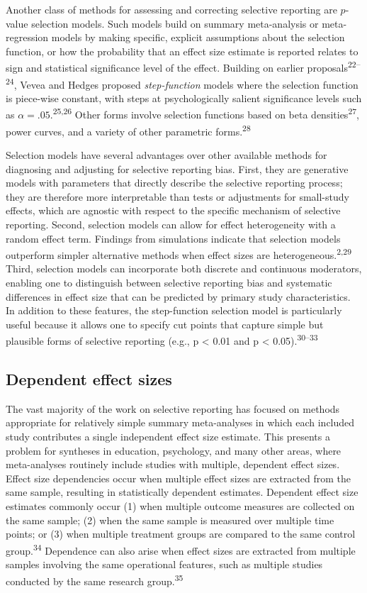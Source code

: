 \documentclass[
  american,
  man, donotrepeattitle,floatsintext]{apa7}
\begin{document}
Another class of methods for assessing and correcting selective reporting are \(p\)-value selection models.
Such models build on summary meta-analysis or meta-regression models by making specific, explicit assumptions about the selection function, or how the probability that an effect size estimate is reported relates to sign and statistical significance level of the effect. Building on earlier proposals\textsuperscript{22--24}, Vevea and Hedges proposed \emph{step-function} models where the selection function is piece-wise constant, with steps at psychologically salient significance levels such as \(\alpha = .05\).\textsuperscript{25,26}
Other forms involve selection functions based on beta densities\textsuperscript{27}, power curves, and a variety of other parametric forms.\textsuperscript{28}

Selection models have several advantages over other available methods for diagnosing and adjusting for selective reporting bias.
First, they are generative models with parameters that directly describe the selective reporting process; they are therefore more interpretable than tests or adjustments for small-study effects, which are agnostic with respect to the specific mechanism of selective reporting.
Second, selection models can allow for effect heterogeneity with a random effect term.
Findings from simulations indicate that selection models outperform simpler alternative methods when effect sizes are heterogeneous.\textsuperscript{2,29}
Third, selection models can incorporate both discrete and continuous moderators, enabling one to distinguish between selective reporting bias and systematic differences in effect size that can be predicted by primary study characteristics.
In addition to these features, the step-function selection model is particularly useful because it allows one to specify cut points that capture simple but plausible forms of selective reporting (e.g., p \textless{} 0.01 and p \textless{} 0.05).\textsuperscript{30--33}

\subsection{Dependent effect sizes}\label{dependent-effect-sizes}

The vast majority of the work on selective reporting has focused on methods appropriate for relatively simple summary meta-analyses in which each included study contributes a single independent effect size estimate.
This presents a problem for syntheses in education, psychology, and many other areas, where meta-analyses routinely include studies with multiple, dependent effect sizes.
Effect size dependencies occur when multiple effect sizes are extracted from the same sample, resulting in statistically dependent estimates.
Dependent effect size estimates commonly occur (1) when multiple outcome measures are collected on the same sample; (2) when the same sample is measured over multiple time points; or (3) when multiple treatment groups are compared to the same control group.\textsuperscript{34}
Dependence can also arise when effect sizes are extracted from multiple samples involving the same operational features, such as multiple studies conducted by the same research group.\textsuperscript{35}
\end{document}
